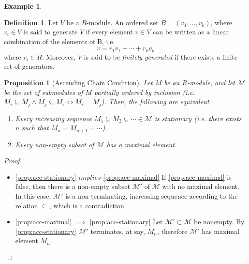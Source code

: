 \documentclass{amsart}
\newtheorem{proposition}[theorem]{Proposition}
\theoremstyle{definition}
\newtheorem{definition}[theorem]{Definition}
\newtheorem{example}[theorem]{Example}
\theoremstyle{remark}
\numberwithin{equation}{section}
\begin{document}
{\begin{example}
\end{example}

\begin{definition}
  Let $V$ be a $R$-module. An ordered set $B = (v_1, \ldots, v_k)$, where $v_i \in V$ is said to generate $V$ if every element $v \in V$ can be written as a linear combination of the elements of B, i.e.
  \begin{equation*}
    v = r_1v_1 + \cdots + r_kv_k
  \end{equation*}
  where $r_i \in R$. Moreover, $V$ is said to be \emph{finitely generated} if there exists a finite set of generators.
\end{definition}


\begin{proposition}[Ascending Chain Condition]
  \label{prop:acc}
  Let $M$ be an $R$-module, and let $\mathcal{M}$ be the set of submodules of $M$ partially ordered by inclusion (i.e. $M_i \subseteq M_j \land M_j \subseteq M_i \iff M_i = M_j$). Then, the following are equivalent
  \begin{enumerate}[i]
  \item \label{prop:acc-stationary} Every increasing sequence $M_1 \subseteq M_2 \subseteq \cdots \in \mathcal{M}$ is stationary (i.e. there exists $n$ such that $M_n = M_{n + 1} = \cdots$).
  \item \label{prop:acc-maximal} Every non-empty subset of $\mathcal{M}$ has a maximal element.
  \end{enumerate}
\end{proposition}

\begin{proof}
  \begin{itemize}
  \item \cref{prop:acc-stationary} $implies$ \cref{prop:acc-maximal}
    If \cref{prop:acc-maximal} is false, then there is a non-empty subset $\mathcal{M'}$ of $\mathcal{M}$ with no maximal element. In this case, $\mathcal{M'}$ is a non-terminating, increasing sequence according to the relation $\subseteq$, which is a contradiction.
  \item \cref{prop:acc-maximal} $\implies$ \cref{prop:acc-stationary}
    Let $\mathcal{M'} \subset \mathcal{M}$ be nonempty. By \cref{prop:acc-stationary} $\mathcal{M'}$ terminates, at say, $M_n$, therefore $\mathcal{M'}$ has maximal element $M_n$.
  \end{itemize}
\end{proof}

}
\end{document}

